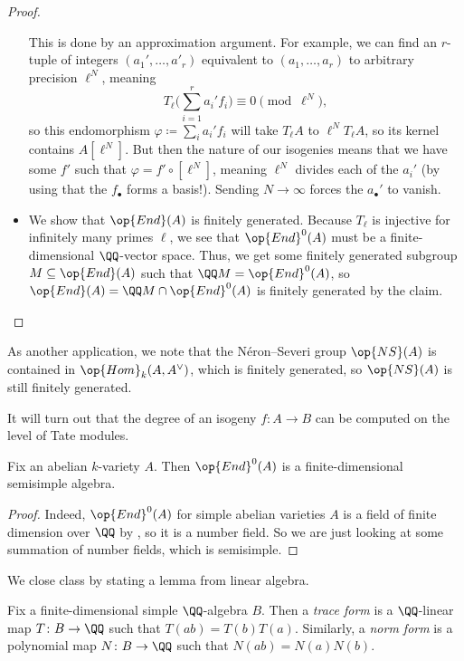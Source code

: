 \documentclass[../notes.tex]{subfiles}
\begin{document}
\begin{proof}
\begin{itemize}
		This is done by an approximation argument. For example, we can find an $r$-tuple of integers $(a_1',\ldots,a'_r)$ equivalent to $(a_1,\ldots,a_r)$ to arbitrary precision $\ell^N$, meaning
		\[T_\ell\Bigg(\sum_{i=1}^ra_i'f_i\Bigg)\equiv0\pmod{\ell^N},\]
		so this endomorphism $\varphi\coloneqq\sum_ia_i'f_i$ will take $T_\ell A$ to $\ell^NT_\ell A$, so its kernel contains $A\left[\ell^N\right]$. But then the nature of our isogenies means that we have some $f'$ such that $\varphi=f'\circ\left[\ell^N\right]$, meaning $\ell^N$ divides each of the $a_i'$ (by using that the $f_\bullet$ forms a basis!). Sending $N\to\infty$ forces the $a_\bullet'$ to vanish.

		\item We show that $\op{End}(A)$ is finitely generated. Because $T_\ell$ is injective for infinitely many primes $\ell$, we see that $\op{End}^0(A)$ must be a finite-dimensional $\QQ$-vector space. Thus, we get some finitely generated subgroup $M\subseteq\op{End}(A)$ such that $\QQ M=\op{End}^0(A)$, so $\op{End}(A)=\QQ M\cap\op{End}^0(A)$ is finitely generated by the claim.
		\qedhere
	\end{itemize}
\end{proof}
\begin{remark}
	As another application, we note that the N\'eron--Severi group $\op{NS}(A)$ is contained in $\op{Hom}_k(A,A^\lor)$, which is finitely generated, so $\op{NS}(A)$ is still finitely generated.
\end{remark}
\begin{remark}
	It will turn out that the degree of an isogeny $f\colon A\to B$ can be computed on the level of Tate modules.
\end{remark}
\begin{corollary}
	Fix an abelian $k$-variety $A$. Then $\op{End}^0(A)$ is a finite-dimensional semisimple algebra.
\end{corollary}
\begin{proof}
	Indeed, $\op{End}^0(A)$ for simple abelian varieties $A$ is a field of finite dimension over $\QQ$ by , so it is a number field. So we are just looking at some summation of number fields, which is semisimple.
\end{proof}
We close class by stating a lemma from linear algebra.
\begin{definition}
	Fix a finite-dimensional simple $\QQ$-algebra $B$. Then a \textit{trace form} is a $\QQ$-linear map $T\colon B\to\QQ$ such that $T(ab)=T(b)T(a)$. Similarly, a \textit{norm form} is a polynomial map $N\colon B\to\QQ$ such that $N(ab)=N(a)N(b)$.
\end{definition}
\end{document}
